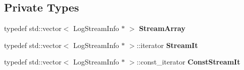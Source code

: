 \subsection*{Private Types}
\begin{DoxyCompactItemize}
\item 
typedef std\+::vector$<$ Log\+Stream\+Info $\ast$ $>$ {\bfseries Stream\+Array}\hypertarget{class_assimp_1_1_default_logger_ae637f8dad053cbd7ff8a012487e8834e}{}\label{class_assimp_1_1_default_logger_ae637f8dad053cbd7ff8a012487e8834e}

\item 
typedef std\+::vector$<$ Log\+Stream\+Info $\ast$ $>$\+::iterator {\bfseries Stream\+It}\hypertarget{class_assimp_1_1_default_logger_a31b16a4573abd75a59b3d259e60de1a1}{}\label{class_assimp_1_1_default_logger_a31b16a4573abd75a59b3d259e60de1a1}

\item 
typedef std\+::vector$<$ Log\+Stream\+Info $\ast$ $>$\+::const\+\_\+iterator {\bfseries Const\+Stream\+It}\hypertarget{class_assimp_1_1_default_logger_a76bd8bb2e4963a98bb2b9cfa632d3b61}{}\label{class_assimp_1_1_default_logger_a76bd8bb2e4963a98bb2b9cfa632d3b61}

\end{DoxyCompactItemize}
